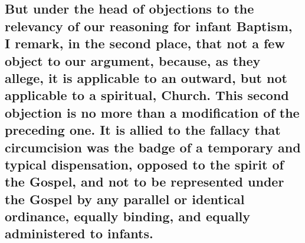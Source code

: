 \documentclass[]{book}
\begin{document}
\hypertarget{but-under-the-head-of-objections-to-the-relevancy-of-our-reasoning-for-infant-baptism-i-remark-in-the-second-place-that-not-a-few-object-to-our-argument-because-as-they-allege-it-is-applicable-to-an-outward-but-not-applicable-to-a-spiritual-church.-this-second-objection-is-no-more-than-a-modification-of-the-preceding-one.-it-is-allied-to-the-fallacy-that-circumcision-was-the-badge-of-a-temporary-and-typical-dispensation-opposed-to-the-spirit-of-the-gospel-and-not-to-be-represented-under-the-gospel-by-any-parallel-or-identical-ordinance-equally-binding-and-equally-administered-to-infants.}{%
\subsection{But under the head of objections to the relevancy of our reasoning for infant Baptism, I remark, in the second place, that not a few object to our argument, because, as they allege, it is applicable to an outward, but not applicable to a spiritual, Church. This second objection is no more than a modification of the preceding one. It is allied to the fallacy that circumcision was the badge of a temporary and typical dispensation, opposed to the spirit of the Gospel, and not to be represented under the Gospel by any parallel or identical ordinance, equally binding, and equally administered to infants.}\label{but-under-the-head-of-objections-to-the-relevancy-of-our-reasoning-for-infant-baptism-i-remark-in-the-second-place-that-not-a-few-object-to-our-argument-because-as-they-allege-it-is-applicable-to-an-outward-but-not-applicable-to-a-spiritual-church.-this-second-objection-is-no-more-than-a-modification-of-the-preceding-one.-it-is-allied-to-the-fallacy-that-circumcision-was-the-badge-of-a-temporary-and-typical-dispensation-opposed-to-the-spirit-of-the-gospel-and-not-to-be-represented-under-the-gospel-by-any-parallel-or-identical-ordinance-equally-binding-and-equally-administered-to-infants.}}
\end{document}
